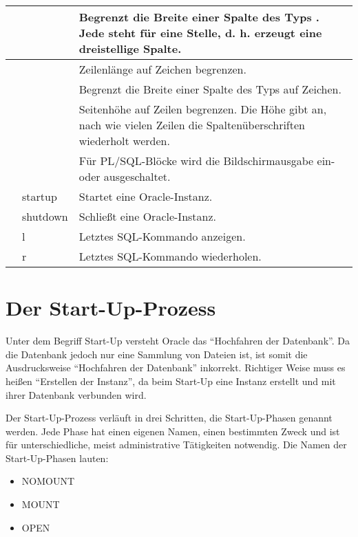 \begin{center}
\begin{small}
\begin{supertabular}{|p{4.25cm}|p{4.25cm}|p{6.25cm}|}
              \hline
               &  & Begrenzt die Breite einer Spalte des Typs . Jede  steht f\"ur eine Stelle, d. h.  erzeugt eine dreistellige Spalte. \\
              \hline
               &  & Zeilenl\"ange auf  Zeichen begrenzen. \\
              \hline
               &  & Begrenzt die Breite einer Spalte des Typs  auf  Zeichen. \\
              \hline
               &  & Seitenh\"ohe auf  Zeilen begrenzen. Die H\"ohe gibt an, nach wie vielen Zeilen die Spalten\"uberschriften wiederholt werden. \\
              \hline
               &  & F\"ur PL/SQL-Bl\"ocke wird die Bild\-schirm\-ausgabe ein- oder ausgeschaltet.\\
              \hline
               & startup & Startet eine Oracle-Instanz. \\
              \hline
               & shutdown & Schlie\ss{}t eine Oracle-Instanz. \\
              \hline
               & l & Letztes SQL-Kommando anzeigen. \\
              \hline
               & r & Letztes SQL-Kommando wiederholen. \\
           \end{supertabular}
          \end{small}
        \end{center}
    \section{Der Start-Up-Prozess}
      Unter dem Begriff Start-Up versteht Oracle das \enquote{Hochfahren der Datenbank}. Da die Datenbank jedoch nur eine Sammlung von Dateien ist, ist somit die Ausdrucksweise \enquote{Hochfahren der Datenbank} inkorrekt. Richtiger Weise muss es hei\ss{}en \enquote{Erstellen der Instanz}, da beim Start-Up eine Instanz erstellt und mit ihrer Datenbank verbunden wird.

      Der Start-Up-Prozess verl\"auft in drei Schritten, die Start-Up-Phasen genannt werden. Jede Phase hat einen eigenen Namen, einen bestimmten Zweck und ist f\"ur unterschiedliche, meist administrative T\"atigkeiten notwendig. Die Namen der Start-Up-Phasen lauten:
      \begin{itemize}
        \item NOMOUNT
        \item MOUNT
        \item OPEN
      \end{itemize}
